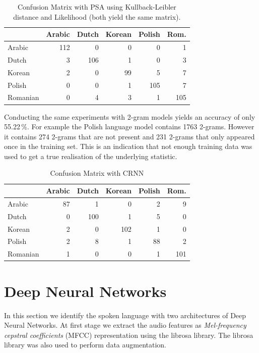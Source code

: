 \documentclass{article}
\begin{document}
\begin{table}[h]
\begin{center}
\begin{tabular}{ l | r r r r r }
          & Arabic & Dutch & Korean & Polish & Rom.\\
\hline
 Arabic   & 112    & 0     & 0      & 0      & 1\\
 Dutch    & 3      & 106   & 1      & 0      & 3\\
 Korean   & 2      & 0     & 99     & 5      & 7\\
 Polish   & 0      & 0     & 1      & 105    & 7\\
 Romanian & 0      & 4     & 3      & 1     & 105\\
\end{tabular}
\end{center}
\caption{Confusion Matrix with PSA using Kullback-Leibler distance and Likelihood (both yield the same matrix). }
\label{tab:confusion_matrix_psa}
\end{table}

Conducting the same experiments with 2-gram models yields an accuracy of only 55.22\,\%. For example the Polish language model contains 1763 2-grams. However it contains 274 2-grams that are not present and 231 2-grams that only appeared once in the training set. This is an indication that not enough training data was used to get a true realisation of the underlying statistic.

\begin{table}[h]
\begin{center}
\begin{tabular}{ l | r r r r r }
          & Arabic & Dutch & Korean & Polish & Rom.\\
\hline
 Arabic   & 87    & 1     & 0      & 2      & 9\\
 Dutch    & 0      & 100   & 1      & 5      & 0\\
 Korean   & 2      & 0     & 102     & 1      & 0\\
 Polish   & 2      & 8     & 1      & 88    & 2\\
 Romanian & 1      & 0     & 0      & 1     & 101\\
\end{tabular}
\end{center}
\caption{Confusion Matrix with CRNN}
\label{tab:confusion_matrix_crnn}
\end{table}

\section{Deep Neural Networks}
\label{sec:dnn}
In this section we identify the spoken language with two architectures of Deep Neural Networks. At first stage we extract the audio features as \emph{Mel-frequency cepstral coefficients} (MFCC) representation using the librosa library. The librosa library was also used to perform data augmentation.
 
\end{document}
